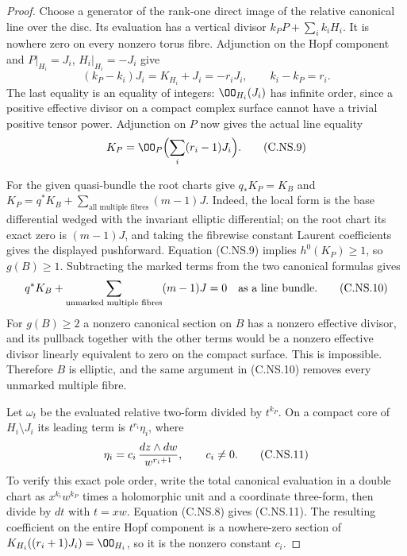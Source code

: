 \begin{proof}
Choose a generator of the rank-one direct image of
the relative canonical line over the disc. Its
evaluation has a vertical divisor
$k_PP+\sum_i k_iH_i$. It is nowhere zero on every
nonzero torus fibre. Adjunction on the Hopf component
and $P|_{H_i}=J_i$, $H_i|_{H_i}=-J_i$ give
\[
 (k_P-k_i)J_i=K_{H_i}+J_i=-r_iJ_i,
       \qquad k_i-k_P=r_i.
                                                        \tag{C.NS.8}
\]
The last equality is an equality of integers:
$\OO_{H_i}(J_i)$ has infinite order, since a
positive effective divisor on a compact complex
surface cannot have a trivial positive tensor power.
Adjunction on $P$ now gives the actual line equality
\[
                         K_P=\OO_P\Bigl(\sum_i(r_i-1)J_i\Bigr).
                                                        \tag{C.NS.9}
\]

For the given quasi-bundle the root charts give
$q_*K_P=K_B$ and
$K_P=q^*K_B+\sum_{\text{all multiple fibres}}(m-1)J$.
Indeed, the local form is the base differential
wedged with the invariant elliptic differential;
on the root chart its exact zero is $(m-1)J$,
and taking the fibrewise constant Laurent
coefficients gives the displayed pushforward.
Equation (C.NS.9) implies $h^0(K_P)\ge1$, so
$g(B)\ge1$. Subtracting the marked terms from
the two canonical formulas gives
\[
 q^*K_B+\sum_{\text{unmarked multiple fibres}}(m-1)J=0
                    \quad\hbox{as a line bundle}.       \tag{C.NS.10}
\]
For $g(B)\ge2$ a nonzero canonical section on $B$
has a nonzero effective divisor, and its pullback
together with the other terms would be a nonzero
effective divisor linearly equivalent to zero on
the compact surface. This is impossible. Therefore
$B$ is elliptic, and the same argument in (C.NS.10)
removes every unmarked multiple fibre.

Let $\omega_t$ be the evaluated relative two-form
divided by $t^{k_P}$. On a compact core of $H_i\setminus J_i$
its leading term is $t^{r_i}\eta_i$, where
\[
 \eta_i=c_i\,{dz\wedge dw\over w^{r_i+1}},
                         \qquad c_i\ne0.                \tag{C.NS.11}
\]
To verify this exact pole order, write the total
canonical evaluation in a double chart as
$x^{k_i}w^{k_P}$ times a holomorphic unit and a
coordinate three-form, then divide by $dt$ with
$t=xw$. Equation (C.NS.8) gives (C.NS.11).
The resulting coefficient on the entire Hopf
component is a nowhere-zero section of
$K_{H_i}((r_i+1)J_i)=\OO_{H_i}$, so it is the
nonzero constant $c_i$.


\end{proof}
